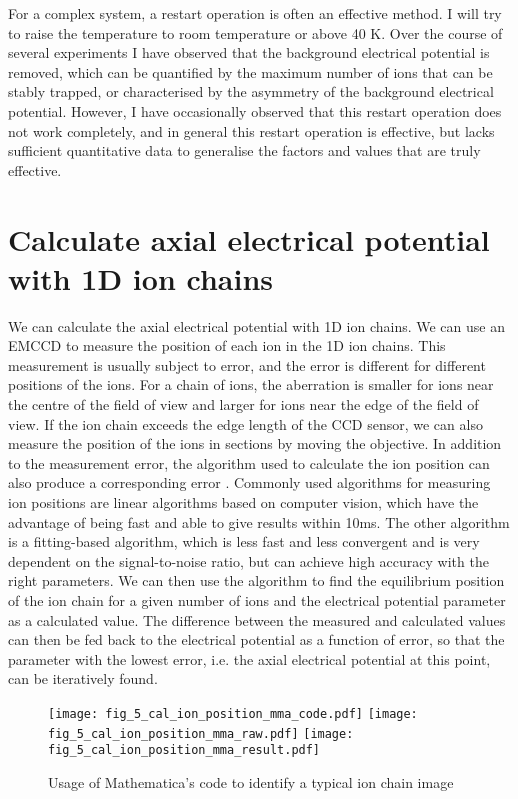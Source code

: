 For a complex system, a restart operation is often an effective method. I will try to raise the temperature to room temperature or above 40 K. Over the course of several experiments I have observed that the background electrical potential is removed, which can be quantified by the maximum number of ions that can be stably trapped, or characterised by the asymmetry of the background electrical potential. However, I have occasionally observed that this restart operation does not work completely, and in general this restart operation is effective, but lacks sufficient quantitative data to generalise the factors and values that are truly effective.



\section{Calculate axial electrical potential with 1D ion chains}

We can calculate the axial electrical potential with 1D ion chains. We can use an EMCCD to measure the position of each ion in the 1D ion chains. This measurement is usually subject to error, and the error is different for different positions of the ions. For a chain of ions, the aberration is smaller for ions near the centre of the field of view and larger for ions near the edge of the field of view. If the ion chain exceeds the edge length of the CCD sensor, we can also measure the position of the ions in sections by moving the objective. In addition to the measurement error, the algorithm used to calculate the ion position can also produce a corresponding error \cite{RN119,RN117,RN228,RN226,RN229,RN227}. Commonly used algorithms for measuring ion positions are linear algorithms based on computer vision, which have the advantage of being fast and able to give results within 10ms. The other algorithm is a fitting-based algorithm, which is less fast and less convergent and is very dependent on the signal-to-noise ratio, but can achieve high accuracy with the right parameters. We can then use the algorithm to find the equilibrium position of the ion chain for a given number of ions and the electrical potential parameter as a calculated value. The difference between the measured and calculated values can then be fed back to the electrical potential as a function of error, so that the parameter with the lowest error, i.e. the axial electrical potential at this point, can be iteratively found.

\begin{figure}
    \centering
    {\texttt{[image: fig\_5\_cal\_ion\_position\_mma\_code.pdf]}}
    {\texttt{[image: fig\_5\_cal\_ion\_position\_mma\_raw.pdf]}}
    {\texttt{[image: fig\_5\_cal\_ion\_position\_mma\_result.pdf]}}
    \caption{Usage of Mathematica's code to identify a typical ion chain image}
    \label{fig:cal_ion_position_mma}
\end{figure}

